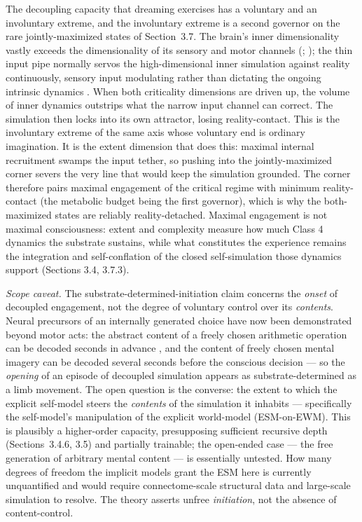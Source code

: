 \documentclass[12pt]{article}
\newcommand{\revend}{}
\begin{document}
{The decoupling capacity that dreaming exercises has a voluntary and an involuntary extreme, and the involuntary extreme is a second governor on the rare jointly-maximized states of Section~3.7. The brain's inner dimensionality vastly exceeds the dimensionality of its sensory and motor channels (\citealp{Stringer2019HighDim}; \citealp{ZhengMeister2025Slowness}); the thin input pipe normally servos the high-dimensional inner simulation against reality continuously, sensory input modulating rather than dictating the ongoing intrinsic dynamics \citep{Fiser2004SmallModulation,Raichle2010TwoViews}. When both criticality dimensions are driven up, the volume of inner dynamics outstrips what the narrow input channel can correct. The simulation then locks into its own attractor, losing reality-contact. This is the involuntary extreme of the same axis whose voluntary end is ordinary imagination. It is the extent dimension that does this: maximal internal recruitment swamps the input tether, so pushing into the jointly-maximized corner severs the very line that would keep the simulation grounded. The corner therefore pairs maximal engagement of the critical regime with minimum reality-contact (the metabolic budget being the first governor), which is why the both-maximized states are reliably reality-detached. Maximal engagement is not maximal consciousness: extent and complexity measure how much Class 4 dynamics the substrate sustains, while what constitutes the experience remains the integration and self-conflation of the closed self-simulation those dynamics support (Sections 3.4, 3.7.3).

\emph{Scope caveat.} The substrate-determined-initiation claim concerns the \emph{onset} of decoupled engagement, not the degree of voluntary control over its \emph{contents}. Neural precursors of an internally generated choice have now been demonstrated beyond motor acts: the abstract content of a freely chosen arithmetic operation can be decoded seconds in advance \citep{Soon2013}, and the content of freely chosen mental imagery can be decoded several seconds before the conscious decision \citep{KoenigRobertPearson2019} --- so the \emph{opening} of an episode of decoupled simulation appears as substrate-determined as a limb movement. The open question is the converse: the extent to which the explicit self-model steers the \emph{contents} of the simulation it inhabits --- specifically the self-model's manipulation of the explicit world-model (ESM-on-EWM). This is plausibly a higher-order capacity, presupposing sufficient recursive depth (Sections~3.4.6, 3.5) and partially trainable; the open-ended case --- the free generation of arbitrary mental content --- is essentially untested. How many degrees of freedom the implicit models grant the ESM here is currently unquantified and would require connectome-scale structural data and large-scale simulation to resolve. The theory asserts unfree \emph{initiation}, not the absence of content-control.\revend}
\end{document}
